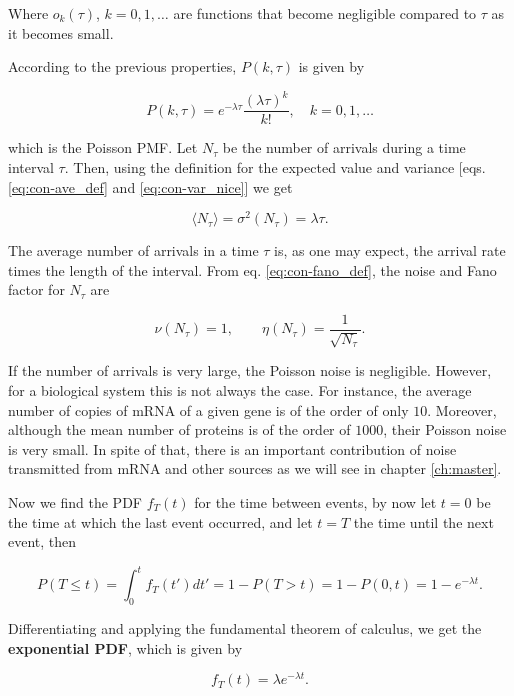     Where $o_k(\tau)$, $k=0,1,\dotsc$ are functions that become negligible compared to $\tau$ as it becomes small.

According to the previous properties, $P(k,\tau)$ is given by

\begin{equation*}
  P(k,\tau) = e^{-\lambda\tau}\frac{(\lambda\tau)^k}{k!},\quad k=0,1,\dotsc
\end{equation*}

which is the Poisson PMF. Let $N_\tau$ be the number of arrivals during a time interval $\tau$. Then, using the definition for the expected value and variance [eqs. \eqref{eq:con-ave_def} and \eqref{eq:con-var_nice}] we get

\begin{equation*}
  \langle N_\tau\rangle = \sigma^2(N_\tau) = \lambda \tau.
\end{equation*}

The average number of arrivals in a time $\tau$ is, as one may expect, the arrival rate times the length of the interval. From eq. \eqref{eq:con-fano_def}, the noise and Fano factor for $N_\tau$ are

\begin{equation*}
  \nu(N_\tau) = 1,\quad\quad \eta(N_\tau) = \frac{1}{\sqrt{N_\tau}}.
\end{equation*}

If the number of arrivals is very large, the Poisson noise is negligible. However, for a biological system this is not always the case. For instance, the average number of copies of mRNA of a given gene is of the order of only $10$. Moreover, although the mean number of proteins is of the order of $1000$, their Poisson noise is very small. In spite of that, there is an important contribution of noise transmitted from mRNA and other sources as we will see in chapter \ref{ch:master}.

Now we find the PDF $f_T(t)$ for the time between events, by now let $t=0$ be the time at which the last event occurred, and let $t=T$ the time until the next event, then

\begin{equation*}
  P(T\leq t) =\int_0^tf_T(t')dt'=1-P(T>t) = 1 - P(0,t) = 1 - e^{-\lambda t}.
\end{equation*}

Differentiating and applying the fundamental theorem of calculus, we get the \textbf{exponential PDF}, which is given by

\begin{equation}
  \label{eq:con-exp_pdf}
  f_T(t) = \lambda e^{-\lambda t}.
\end{equation}

